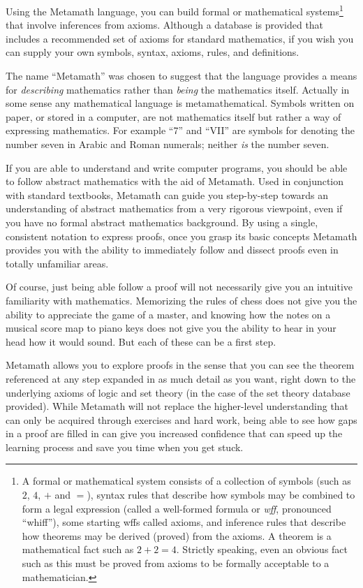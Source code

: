Using the Metamath language, you can build formal or mathematical
systems\footnote{A formal or mathematical system consists
of a collection of symbols (such as $2$, $4$, $+$ and $=$), syntax rules that
describe how symbols may be combined to form a legal expression (called a
well-formed formula or {\em wff}, pronounced ``whiff''), some starting wffs
called axioms, and inference rules that describe how theorems may be derived
(proved) from the axioms.  A theorem is a mathematical fact such as $2+2=4$.
Strictly speaking, even an obvious fact such as this must be proved from
axioms to be formally acceptable to a mathematician.}
 that involve
inferences from axioms.  Although a database is provided
that includes a recommended set of axioms for standard mathematics, if you
wish you can supply your own symbols, syntax, axioms, rules, and definitions.

The name ``Metamath'' was chosen to suggest that the language provides a
means for {\em describing} mathematics rather than {\em being} the
mathematics itself.  Actually in some sense any mathematical language is
metamathematical.  Symbols written on paper, or stored in a computer,
are not mathematics itself but rather a way of expressing mathematics.
For example ``7'' and ``VII'' are symbols for denoting the number seven
in Arabic and Roman numerals; neither {\em is} the number seven.

If you are able to understand and write computer programs, you should be able
to follow abstract mathematics with the aid of Metamath.  Used in conjunction
with standard textbooks, Metamath can guide you step-by-step towards an
understanding of abstract mathematics from a very rigorous viewpoint, even if
you have no formal abstract mathematics background.  By using a single,
consistent notation to express proofs, once you grasp its basic concepts
Metamath provides you with the ability to immediately follow and dissect
proofs even in totally unfamiliar areas.

Of course, just being able follow a proof will not necessarily give you an
intuitive familiarity with mathematics.  Memorizing the rules of chess does not
give you the ability to appreciate the game of a master, and knowing how the
notes on a musical score map to piano keys does not give you the ability to
hear in your head how it would sound.  But each of these can be a first step.

Metamath allows you to explore proofs in the sense that you can see the
theorem referenced at any step expanded in as much detail as you want, right
down to the underlying axioms of logic and set theory (in the case of the set
theory database provided).  While Metamath will not replace the higher-level
understanding that can only be acquired through exercises and hard work, being
able to see how gaps in a proof are filled in can give you increased
confidence that can speed up the learning process and save you time when you
get stuck.

